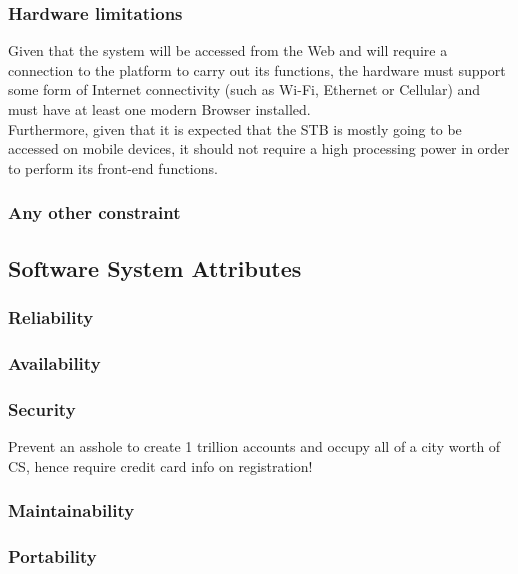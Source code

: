 \documentclass[11pt]{article}
\begin{document}
\subsubsection{Hardware limitations}
Given that the system will be accessed from the Web and will require a connection to the platform to carry out its functions, the hardware must support some form of Internet connectivity (such as Wi-Fi, Ethernet or Cellular) and must have at least one modern Browser installed. \\
Furthermore, given that it is expected that the STB is mostly going to be accessed on mobile devices, it should not require a high processing power in order to perform its front-end functions. \\

\subsubsection{Any other constraint}

\subsection{Software System Attributes}

\subsubsection{Reliability}

\subsubsection{Availability}

\subsubsection{Security}

Prevent an asshole to create 1 trillion accounts and occupy all of a city worth of CS, hence require credit card info on registration!

\subsubsection{Maintainability}

\subsubsection{Portability}

\newpage
\end{document}
